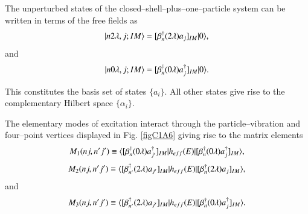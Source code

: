 The unperturbed states of the closed--shell--plus--one--particle system can be written in terms of the free fields as 
  \begin{align}\label{eqC1A81} 
   |{n2\lambda,j;IM} \rangle=[\beta^\dagger_n(2\lambda)a_j]_{IM}|{0} \rangle,
    \end{align}  
and 
  \begin{align}\label{eqC1A82} 
   |{n0\lambda,j;IM} \rangle=[\beta^\dagger_n(0\lambda)a^\dagger_j]_{IM}|{0} \rangle.
    \end{align}   


This constitutes the basis set of states $\{a_i\}$. All other states give rise to the complementary Hilbert space $\{\alpha_i\}$. 


The elementary modes of excitation interact through the particle--vibration and four--point vertices displayed in Fig. \ref{figC1A6} giving rise to the matrix elements 
  \begin{align}\label{eqC1A83} 
   M_1(nj,n'j')\equiv \langle {[\beta^\dagger_n(0\lambda)a^\dagger_{j'}]_{IM}|h_{eff}(E)|[\beta^\dagger_n(0\lambda)a^\dagger_j]_{IM}} \rangle,
    \end{align}   
  \begin{align}\label{eqC1A84} 
   M_2(nj,n'j')\equiv \langle {[\beta^\dagger_{n'}(2\lambda)a_{j'}]_{IM}|h_{eff}(E)|[\beta^\dagger_n(2\lambda)a_j]_{IM}} \rangle,
    \end{align}    
and 
  \begin{align}\label{eqC1A85} 
   M_3(nj,n'j')\equiv \langle {[\beta^\dagger_{n'}(2\lambda)a_{j'}]_{IM}|h_{eff}(E)|[\beta^\dagger_{n}(0\lambda)a^\dagger_j]_{IM}} \rangle.
    \end{align}   
